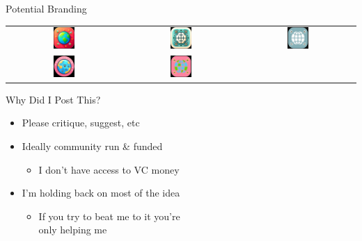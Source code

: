 \documentclass[aspectratio=35]{beamer} %
\begin{document}
\begin{frame}{Potential Branding}
\begin{tabular}{ccc}
    \includegraphics[width=0.2\textwidth]{imgs/app_icons/3.png} & \includegraphics[width=0.2\textwidth]{imgs/app_icons/4.png} & \includegraphics[width=0.2\textwidth]{imgs/app_icons/5.png} \\ 
    \includegraphics[width=0.2\textwidth]{imgs/app_icons/2.png} & \includegraphics[width=0.2\textwidth]{imgs/app_icons/6.png} 
\end{tabular}
\end{frame}

\begin{frame}{Why Did I Post This?}
\vspace{-1.5in}
\begin{itemize}
    \item Please critique, suggest, etc
    \item Ideally community run \& funded
    \begin{itemize}
        \item I don't have access to VC money
    \end{itemize}
    \item I'm holding back on most of the idea
    \begin{itemize}
        \item If you try to beat me to it you're\\only helping me
    \end{itemize}
\end{itemize}
\end{frame}
\end{document}
